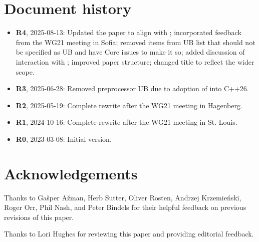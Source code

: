 \section*{Document history}
\begin{itemize}
\item \textbf{R4}, 2025-08-13: Updated the paper to align with \cite{P3754R0}; incorporated feedback from the WG21 meeting in Sofia; removed items from UB list that should not be specified as UB and have Core issues to make it so; added discussion of interaction with ; improved paper structure; changed title to reflect the wider scope.
\item \textbf{R3}, 2025-06-28: Removed preprocessor UB due to adoption of \cite{P2843R3} into C++26.
\item \textbf{R2}, 2025-05-19: Complete rewrite after the WG21 meeting in Hagenberg.
\item \textbf{R1}, 2024-10-16: Complete rewrite after the WG21 meeting in St. Louis.
\item \textbf{R0}, 2023-03-08: Initial version.
\end{itemize}

\section*{Acknowledgements}

Thanks to Ga\v{s}per A\v{z}man, Herb Sutter, Oliver Rosten, Andrzej Krzemie{\'n}ski, Roger Orr, Phil Nash, and Peter Bindels for their helpful feedback on previous revisions of this paper.

Thanks to Lori Hughes for reviewing this paper and providing editorial feedback. 


\renewcommand{\addcontentsline}[3]{}%








